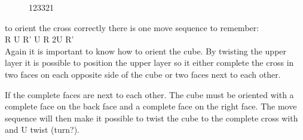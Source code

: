 \begin{figure}[htb]
	\centering
		\hspace{0.05\textwidth}
		\hspace{0.05\textwidth}
		\caption{123321}
		\label{fig:something}
\end{figure}


to orient the cross correctly there is one move sequence to remember: \\

R U R' U R 2U R' \\

Again it is important to know how to orient the cube. By twisting the upper layer it is possible to position the upper layer so it either complete the cross in two faces on each opposite side of the cube or two faces next to each other.

If the complete faces are next to each other. The cube must be oriented with a complete face on the back face and a complete face on the right face. The move sequence will then make it possible to twist the cube to the complete cross with and U twist (turn?).

